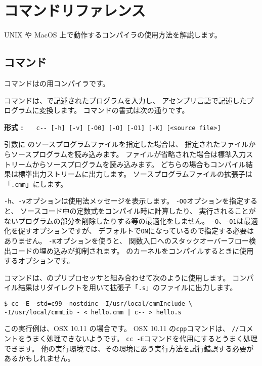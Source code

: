 % 
%
\chapter{コマンドリファレンス}

UNIX や MacOS 上で動作する{\cmm}コンパイラの使用方法を解説します。

\section{{\cmmc}コマンド}

{\cmmc}コマンドは{\cmml}の{\tac}用コンパイラです。

\cmmc コマンドは、\cmml で記述されたプログラムを入力し、
\tac アセンブリ言語で記述したプログラムに変換します。
\cmmc コマンドの書式は次の通りです。

\begin{flushleft}
{\bf 形式 : }~~~\verb/c-- [-h] [-v] [-O0] [-O] [-O1] [-K] [<source file>]/
\end{flushleft}

引数に \cmml のソースプログラムファイルを指定した場合は、
指定されたファイルからソースプログラムを読み込みます。
ファイルが省略された場合は標準入力ストリームからソースプログラムを読み込みます。
どちらの場合もコンパイル結果は標準出力ストリームに出力します。
ソースプログラムファイルの拡張子は「\verb/.cmm/」にします。

\verb/-h/、\verb/-v/オプションは使用法メッセージを表示します。
\verb/-O0/オプションを指定すると、
ソースコード中の定数式をコンパイル時に計算したり、
実行されることがないプログラムの部分を削除したりする等の最適化をしません。
\verb/-O/、\verb/-O1/は最適化を促すオプションですが、
デフォルトで\verb/ON/になっているので指定する必要はありません。
\verb/-K/オプションを使うと、
関数入口へのスタックオーバーフロー検出コードの埋め込みが抑制されます。
\tacos のカーネルをコンパイルするときに使用するオプションです。

\cmmc コマンドは、\cl のプリプロセッサと組み合わせて次のように使用します。
コンパイル結果はリダイレクトを用いて拡張子「\verb/.s/」のファイルに出力します。

\begin{mylist}
\begin{verbatim}
$ cc -E -std=c99 -nostdinc -I/usr/local/cmmInclude \
-I/usr/local/cmmLib - < hello.cmm | c-- > hello.s
\end{verbatim}
\end{mylist}

この実行例は、OSX 10.11 の場合です。
OSX 10.11 の\verb/cpp/コマンドは、
\verb;//;コメントをうまく処理できないようです。
\verb/cc -E/コマンドを代用にするとうまく処理できます。
他の実行環境では、その環境にあう実行方法を試行錯誤する必要があるかもしれません。

